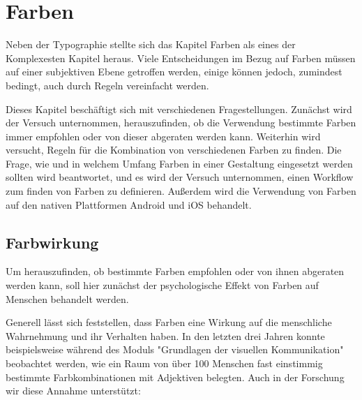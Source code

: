
\newcommand{\chaptertitle}{Farben}

\chapter{\chaptertitle} %

\label{Farben} %

\lhead{\chaptername{} \thechapter{} - \emph{\chaptertitle}} %


Neben der Typographie stellte sich das Kapitel Farben als eines der Komplexesten Kapitel heraus. Viele Entscheidungen im Bezug auf Farben müssen auf einer subjektiven Ebene getroffen werden, einige können jedoch, zumindest bedingt, auch durch Regeln vereinfacht werden.

Dieses Kapitel beschäftigt sich mit verschiedenen Fragestellungen. Zunächst wird der Versuch unternommen, herauszufinden, ob die Verwendung bestimmte Farben immer empfohlen oder von dieser abgeraten werden kann.
Weiterhin wird versucht, Regeln für die Kombination von verschiedenen Farben zu finden. Die Frage, wie und in welchem Umfang Farben in einer Gestaltung eingesetzt werden sollten wird beantwortet, und es wird der Versuch unternommen, einen Workflow zum finden von Farben zu definieren. Außerdem wird die Verwendung von Farben auf den nativen Plattformen Android und iOS behandelt.


\section{Farbwirkung}

Um herauszufinden, ob bestimmte Farben empfohlen oder von ihnen abgeraten werden kann, soll hier zunächst der psychologische Effekt von Farben auf Menschen behandelt werden.

Generell lässt sich feststellen, dass Farben eine Wirkung auf die menschliche Wahrnehmung und ihr Verhalten haben. In den letzten drei Jahren konnte beispielsweise während des Moduls "Grundlagen der visuellen Kommunikation" beobachtet werden, wie ein Raum von über 100 Menschen fast einstimmig bestimmte Farbkombinationen mit Adjektiven belegten. Auch in der Forschung wir diese Annahme unterstützt:

